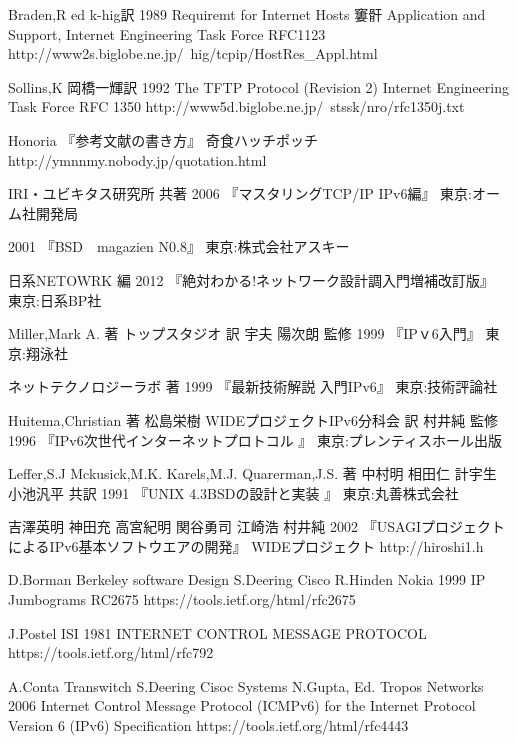\begin{thebibliography}{99}
\item
      Braden,R ed
	k-hig訳
	1989
	Requiremt for Internet Hosts 窶骭 Application and Support, Internet Engineering Task Force RFC1123
      http://www2s.biglobe.ne.jp/~hig/tcpip/HostRes\_Appl.html
\item
      Sollins,K
	岡橋一輝訳
	1992
	The TFTP Protocol (Revision 2) Internet Engineering Task Force RFC 1350
     http://www5d.biglobe.ne.jp/~stssk/nro/rfc1350j.txt
\item
	Honoria
	『参考文献の書き方』
	奇食ハッチポッチ
	http://ymnnmy.nobody.jp/quotation.html
\item
	IRI・ユビキタス研究所 共著
	2006
	『マスタリングTCP/IP IPv6編』
	東京:オーム社開発局
\item
	2001
	『BSD　magazien N0.8』
	東京:株式会社アスキー
\item
	日系NETOWRK 編
	2012
	『絶対わかる!ネットワーク設計調入門増補改訂版』
	東京:日系BP社
\item
	Miller,Mark A. 著
	トップスタジオ 訳
	宇夫 陽次朗 監修
	1999
	『IPｖ6入門』
	東京:翔泳社
\item
	ネットテクノロジーラボ 著
	1999
	『最新技術解説 入門IPv6』
	東京:技術評論社
\item
	Huitema,Christian 著
	松島栄樹 WIDEプロジェクトIPv6分科会 訳
	村井純 監修
	1996
	『IPv6次世代インターネットプロトコル 』
	東京:プレンティスホール出版
\item
	Leffer,S.J Mckusick,M.K. Karels,M.J. Quarerman,J.S. 著
	中村明 相田仁 計宇生 小池汎平 共訳
	1991
	『UNIX 4.3BSDの設計と実装 』
	東京:丸善株式会社
\item
	吉澤英明 神田充 高宮紀明 関谷勇司 江崎浩 村井純
	2002
	『USAGIプロジェクトによるIPv6基本ソフトウエアの開発』
	WIDEプロジェクト
	http://hiroshi1.h
\item
	D.Borman Berkeley software Design S.Deering Cisco  R.Hinden Nokia
	1999
	 IP Jumbograms RC2675
	 https://tools.ietf.org/html/rfc2675
\item
	J.Postel ISI
	1981
	INTERNET CONTROL MESSAGE PROTOCOL
	https://tools.ietf.org/html/rfc792
\item
	A.Conta Transwitch S.Deering Cisoc Systems  N.Gupta, Ed. Tropos Networks
	2006
	Internet Control Message Protocol (ICMPv6) for the Internet Protocol Version 6 (IPv6) Specification
	https://tools.ietf.org/html/rfc4443
\end{thebibliography}